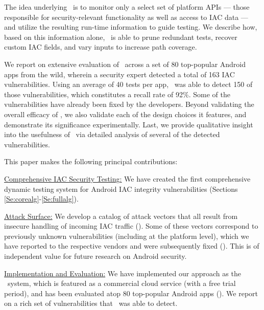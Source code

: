The idea underlying \Tool\ is to monitor only a select set of platform APIs --- those responsible for security-relevant functionality as well as access to IAC data --- and utilize the resulting run-time information to guide testing. We describe how, based on this information alone, \Tool\ is able to prune redundant tests, recover custom IAC fields, and vary inputs to increase path coverage.  

We report on extensive evaluation of \Tool\ across a set of 80 top-popular Android apps from the wild, wherein a security expert detected a total of 163 IAC vulnerabilities. 
Using an average of 40 tests per app, \Tool\ was able to detect 150 of those vulnerabilities, which constitutes a recall rate of 92\%. Some of the vulnerabilities have already been fixed by the developers. Beyond validating the overall efficacy of \Tool, we also validate each of the design choices it features, and demonstrate its significance experimentally. Last, we provide qualitative insight into the usefulness of \Tool\ via detailed analysis of several of the detected vulnerabilities.

 This paper makes the following principal contributions:
\begin{compactenum}
	\item \underline{Comprehensive IAC Security Testing:} We have created the first comprehensive dynamic testing system for Android IAC integrity vulnerabilities (Sections \ref{Se:corealg}-\ref{Se:fullalg}).
	\item \underline{Attack Surface:} We develop a catalog of attack vectors that all result from insecure handling of incoming IAC traffic (). Some of these vectors correspond to previously unknown vulnerabilities (including at the platform level), which we have reported to the respective vendors and were subsequently fixed (). This is of independent value for future research on Android security. 
	\item \underline{Implementation and Evaluation:} We have implemented our approach as the \Tool\ system, which is featured as a commercial cloud service (with a free trial period), and has been evaluated atop 80 top-popular Android apps (). We report on a rich set of vulnerabilities that \Tool\ was able to detect.
\end{compactenum}


 